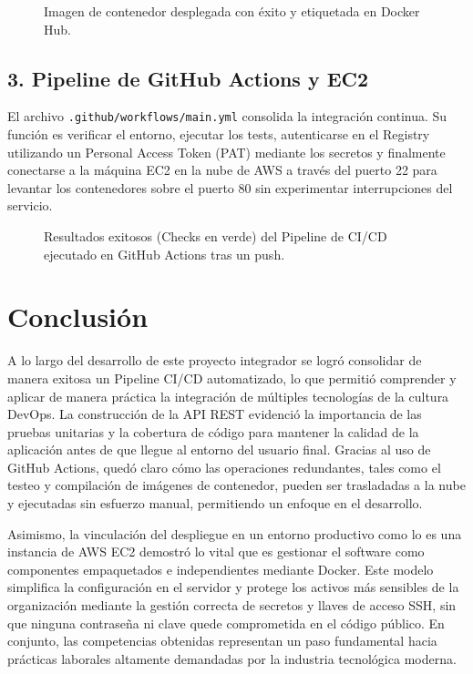 \documentclass[12pt,a4paper]{article}
\begin{document}
\begin{figure}[H]
    \centering
    \caption{Imagen de contenedor desplegada con éxito y etiquetada en Docker Hub.}
    \label{fig:dockerhub}
\end{figure}

\subsection*{3. Pipeline de GitHub Actions y EC2}
El archivo \texttt{.github/workflows/main.yml} consolida la integración continua. Su función es verificar el entorno, ejecutar los tests, autenticarse en el Registry utilizando un Personal Access Token (PAT) mediante los secretos y finalmente conectarse a la máquina EC2 en la nube de AWS a través del puerto 22 para levantar los contenedores sobre el puerto 80 sin experimentar interrupciones del servicio.

\begin{figure}[H]
    \centering
    \caption{Resultados exitosos (Checks en verde) del Pipeline de CI/CD ejecutado en GitHub Actions tras un push.}
    \label{fig:actions}
\end{figure}

\newpage

\section*{Conclusión}
A lo largo del desarrollo de este proyecto integrador se logró consolidar de manera exitosa un Pipeline CI/CD automatizado, lo que permitió comprender y aplicar de manera práctica la integración de múltiples tecnologías de la cultura DevOps. La construcción de la API REST evidenció la importancia de las pruebas unitarias y la cobertura de código para mantener la calidad de la aplicación antes de que llegue al entorno del usuario final. Gracias al uso de GitHub Actions, quedó claro cómo las operaciones redundantes, tales como el testeo y compilación de imágenes de contenedor, pueden ser trasladadas a la nube y ejecutadas sin esfuerzo manual, permitiendo un enfoque en el desarrollo.

Asimismo, la vinculación del despliegue en un entorno productivo como lo es una instancia de AWS EC2 demostró lo vital que es gestionar el software como componentes empaquetados e independientes mediante Docker. Este modelo simplifica la configuración en el servidor y protege los activos más sensibles de la organización mediante la gestión correcta de secretos y llaves de acceso SSH, sin que ninguna contraseña ni clave quede comprometida en el código público. En conjunto, las competencias obtenidas representan un paso fundamental hacia prácticas laborales altamente demandadas por la industria tecnológica moderna.
\end{document}
